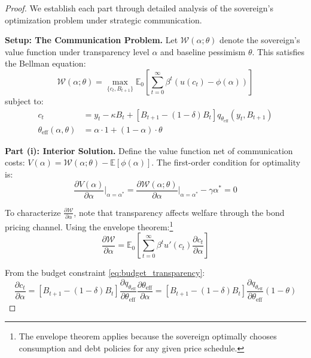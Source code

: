 \documentclass[12pt]{article}
\theoremstyle{plain}
\begin{document}
\begin{proof}
	We establish each part through detailed analysis of the sovereign's optimization problem under strategic communication.

	\textbf{Setup: The Communication Problem.}
	Let $\mathcal{W}(\alpha; \theta)$ denote the sovereign's value function under transparency level $\alpha$ and baseline pessimism $\theta$. This satisfies the Bellman equation:
	\begin{equation}
		\mathcal{W}(\alpha; \theta) = \max_{\{c_t, B_{t+1}\}} \mathbb{E}_0 \left[ \sum_{t=0}^\infty \beta^t \left( u(c_t) - \phi(\alpha) \right) \right] \label{eq:welfare_transparency}
	\end{equation}
	subject to:
	\begin{align}
		c_t                                 & = y_t - \kappa B_t + [B_{t+1} - (1-\delta)B_t] q_{\theta_{\text{eff}}}(y_t, B_{t+1}) \label{eq:budget_transparency} \\
		\theta_{\text{eff}}(\alpha, \theta) & = \alpha \cdot 1 + (1-\alpha) \cdot \theta \label{eq:effective_theta_proof}
	\end{align}

	\textbf{Part (i): Interior Solution.}
	Define the value function net of communication costs: $V(\alpha) = \mathcal{W}(\alpha; \theta) - \mathbb{E}[\phi(\alpha)]$. The first-order condition for optimality is:
	\begin{equation}
		\frac{\partial V(\alpha)}{\partial \alpha}\bigg|_{\alpha=\alpha^*} = \frac{\partial \mathcal{W}(\alpha; \theta)}{\partial \alpha}\bigg|_{\alpha=\alpha^*} - \gamma \alpha^* = 0 \label{eq:foc_detailed}
	\end{equation}

	To characterize $\frac{\partial \mathcal{W}}{\partial \alpha}$, note that
	transparency affects welfare through the bond pricing channel. Using the
	envelope theorem:\footnote{The envelope theorem applies because the sovereign
		optimally chooses consumption and debt policies for any given price schedule.}
	\begin{equation}
		\frac{\partial \mathcal{W}}{\partial \alpha} = \mathbb{E}_0 \left[ \sum_{t=0}^\infty \beta^t u'(c_t) \frac{\partial c_t}{\partial \alpha} \right] \label{eq:welfare_derivative}
	\end{equation}

	From the budget constraint \eqref{eq:budget_transparency}:
	\begin{equation}
		\frac{\partial c_t}{\partial \alpha} = [B_{t+1} - (1-\delta)B_t] \frac{\partial q_{\theta_{\text{eff}}}}{\partial \theta_{\text{eff}}} \frac{\partial \theta_{\text{eff}}}{\partial \alpha} = [B_{t+1} - (1-\delta)B_t] \frac{\partial q_{\theta_{\text{eff}}}}{\partial \theta_{\text{eff}}} (1-\theta) \label{eq:consumption_derivative_alpha}
	\end{equation}


\end{proof}
\end{document}
